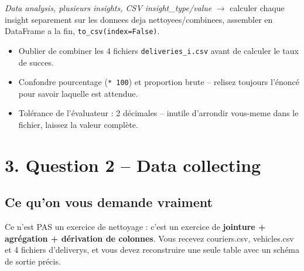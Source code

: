 \documentclass[11pt]{article}
\newcommand{\exhead}[1]{\subsection{#1}}
\begin{document}
\begin{pat}
\emph{\og Data analysis, plusieurs insights, CSV insight\_type/value \fg}
$\to$ calculer chaque insight separement sur les donnees deja
nettoyees/combinees, assembler en DataFrame a la fin,
\texttt{to\_csv(index=False)}.
\end{pat}

\begin{trap}
\begin{itemize}[nosep]
  \item Oublier de combiner les 4 fichiers \texttt{deliveries\_i.csv} avant
        de calculer le taux de succes.
  \item Confondre pourcentage (\texttt{* 100}) et proportion brute --
        relisez toujours l'\'enonc\'e pour savoir laquelle est attendue.
  \item Tol\'erance de l'\'evaluateur : 2 d\'ecimales -- inutile
        d'arrondir vous-meme dans le fichier, laissez la valeur compl\`ete.
\end{itemize}
\end{trap}

\section{3. Question 2 -- Data collecting}

\exhead{Ce qu'on vous demande vraiment}
Ce n'est PAS un exercice de nettoyage : c'est un exercice de
\textbf{jointure + agr\'egation + d\'erivation de colonnes}. Vous recevez
couriers.csv, vehicles.csv et 4 fichiers
d'deliverys, et vous devez reconstruire une seule table
avec un sch\'ema de sortie pr\'ecis.
\end{document}
